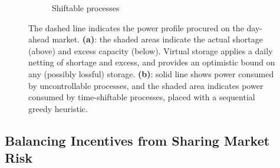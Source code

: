 \documentclass[conference]{IEEEtran}
\begin{document}
\begin{figure}[t!]
\begin{subfigure}[b]{0.45\columnwidth}
        \caption{Shiftable processes}
        \label{fig:movable}
    \end{subfigure}
\caption{The dashed line indicates the power profile procured on the day-ahead market. \textbf{(a)}: the shaded areas indicate the actual shortage (above) and excess capacity (below). Virtual storage applies a daily netting of shortage and excess, and provides an optimistic bound on any (possibly lossful) storage. \textbf{(b)}: solid line shows power consumed by uncontrollable processes, and the shaded area indicates power consumed by time-shiftable processes, placed with a sequential greedy heuristic.}
\label{fig:shortage}
\end{figure}




\subsection{Balancing Incentives from Sharing Market Risk}
\end{document}
